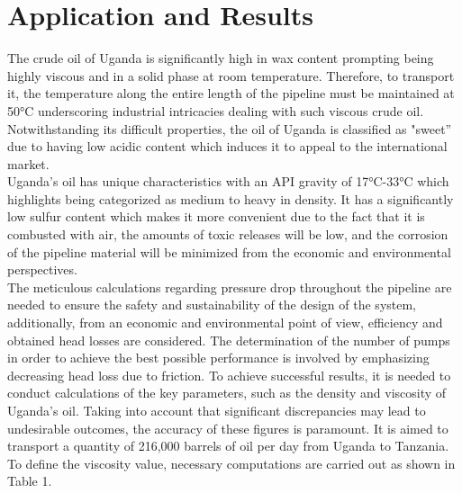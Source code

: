 \documentclass[12pt]{article}
\begin{document}
\section{Application and Results}
{\fontsize{12}{12}\selectfont 
The crude oil of Uganda is significantly high in wax content prompting being highly viscous and in a solid phase at room temperature. Therefore, to transport it, the temperature along the entire length of the pipeline must be maintained at 50°C underscoring industrial intricacies dealing with such viscous crude oil. Notwithstanding its difficult properties, the oil of Uganda is classified as "sweet” due to having low acidic content which induces it to appeal to the international market. 
\\

Uganda's oil has unique characteristics with an API gravity of 17°C-33°C which highlights being categorized as medium to heavy in density. It has a significantly low sulfur content which makes it more convenient due to the fact that it is combusted with air, the amounts of toxic releases will be low, and the corrosion of the pipeline material will be minimized from the economic and environmental perspectives.
\\

The meticulous calculations regarding pressure drop throughout the pipeline are needed to ensure the safety and sustainability of the design of the system, additionally, from an economic and environmental point of view, efficiency and obtained head losses are considered. The determination of the number of pumps in order to achieve the best possible performance is involved by emphasizing decreasing head loss due to friction. To achieve successful results, it is needed to conduct calculations of the key parameters, such as the density and viscosity of Uganda's oil. Taking into account that significant discrepancies may lead to undesirable outcomes, the accuracy of these figures is paramount. It is aimed to transport a quantity of 216,000 barrels of oil per day from Uganda to Tanzania.
\\

To define the viscosity value, necessary computations are carried out as shown in Table 1.

}
\end{document}
